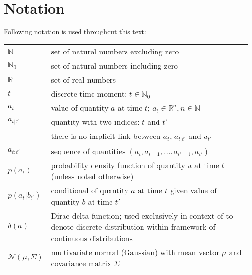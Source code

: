 \chapter*{Notation} 

Following notation is used throughout this text:

\bigskip

\begin{tabular}{l p{}}
	\(\mathbb{N}\) & set of natural numbers excluding zero \\
	\(\mathbb{N}_0\) & set of natural numbers including zero \\
	\(\mathbb{R}\) & set of real numbers \\
	\(t\) & discrete time moment; \(t \in \mathbb{N}_0\) \\
	\(a_t\) & value of quantity \(a\) at time \(t\); \(a_t \in \mathbb{R}^n, n \in \mathbb{N}\) \\
	\(a_{t|t'}\) & quantity with two indices: \(t\) and \(t'\) \\
		& there is no implicit link between \(a_{t}\), \(a_{t|t'}\) and \(a_{t'}\) \\
	\(a_{t:t'}\) & sequence of quantities \((a_t, a_{t+1}, \dotsc, a_{t'-1}, a_{t'})\) \\
	\(p(a_t)\) & probability density function{\footnotemark[1]} of quantity \(a\) at time \(t\) (unless
		noted otherwise) \\
	\(p(a_t|b_{t'})\) & conditional {\pdf} of quantity \(a\) at time \(t\) given value of quantity
		\(b\) at time \(t'\) \\
	\(\delta(a)\) & Dirac delta function; used exclusively in context of {\pdfs} to denote discrete
		distribution within framework of continuous distributions{\footnotemark[2]} \\
	\(\mathcal{N}(\mu, \Sigma)\) & multivariate normal (Gaussian) {\pdf} with mean vector \(\mu\)
		and covariance matrix \(\Sigma\) \\
\end{tabular}


